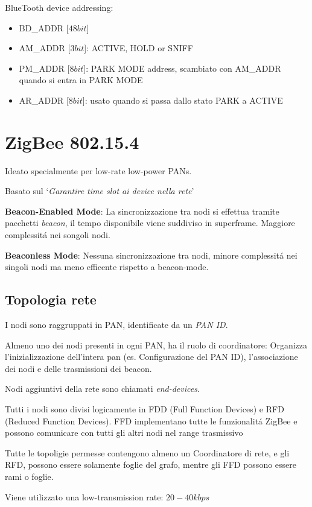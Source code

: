 \documentclass{article}
\begin{document}
BlueTooth device addressing:
\begin{itemize}
    \item BD\_ADDR [$48 bit$]
    \item AM\_ADDR [$3 bit$]: ACTIVE, HOLD or SNIFF
    \item PM\_ADDR [$8 bit$]: PARK MODE address, scambiato con AM\_ADDR quando si entra in PARK MODE
    \item AR\_ADDR [$8 bit$]: usato quando si passa dallo stato PARK a ACTIVE
\end{itemize}

\section{ZigBee 802.15.4}
Ideato specialmente per low-rate low-power PANs.

Basato sul `\textit{Garantire time slot ai device nella rete}'


\textbf{Beacon-Enabled Mode}: La sincronizzazione tra nodi si effettua tramite pacchetti \textit{beacon}, il tempo disponibile viene suddiviso in superframe. Maggiore complessit\'a nei songoli nodi.

\textbf{Beaconless Mode}: Nessuna sincronizzazione tra nodi, minore complessit\'a nei singoli nodi ma meno efficente rispetto a beacon-mode.

\subsection{Topologia rete}
I nodi sono raggruppati in PAN, identificate da un \textit{PAN ID}.

Almeno uno dei nodi presenti in ogni PAN, ha il ruolo di coordinatore: Organizza l'inizializzazione dell'intera pan (es. Configurazione del PAN ID), l'associazione dei nodi e delle trasmissioni dei beacon.

Nodi aggiuntivi della rete sono chiamati \textit{end-devices}.

Tutti i nodi sono divisi logicamente in FDD (Full Function Devices) e RFD (Reduced Function Devices). FFD implementano tutte le funzionalit\'a ZigBee e possono comunicare con tutti gli altri nodi nel range trasmissivo

Tutte le topoligie permesse contengono almeno un Coordinatore di rete, e gli RFD, possono essere solamente foglie del grafo, mentre gli FFD possono essere rami o foglie.

Viene utilizzato una low-transmission rate: $20-40 kbps$
\end{document}
